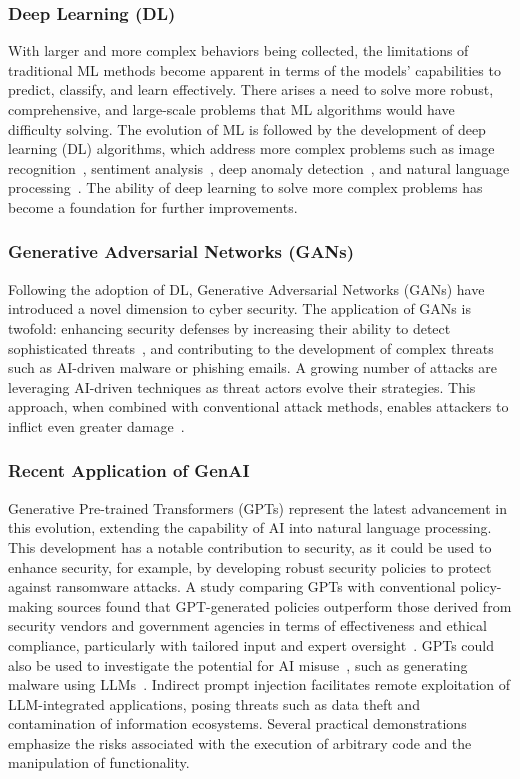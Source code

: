 \subsubsection{Deep Learning (DL)}
%
With larger and more complex behaviors being collected, the limitations of traditional ML methods become apparent in terms of the models' capabilities to predict, classify, and learn effectively.
There arises a need to solve more robust, comprehensive, and large-scale problems that ML algorithms would have difficulty solving.
The evolution of ML is followed by the development of deep learning (DL) algorithms, which address more complex problems such as image recognition~\citet{Alzubaidi2021-dk}, sentiment analysis~\citet{zhang2018deep}, deep anomaly detection~\citet{pang2021deep}, and natural language processing~\citet{ghosh2016contextual}.
The ability of deep learning to solve more complex problems has become a foundation for further improvements.
%
\subsubsection{Generative Adversarial Networks (GANs)}
%
Following the adoption of DL, Generative Adversarial Networks (GANs) have introduced a novel dimension to cyber security.
The application of GANs is twofold: enhancing security defenses by increasing their ability to detect sophisticated threats~\citet{park2022enhanced, yinka2020review}, and contributing to the development of complex threats such as AI-driven malware or phishing emails.
A growing number of attacks are leveraging AI-driven techniques as threat actors evolve their strategies. This approach, when combined with conventional attack methods, enables attackers to inflict even greater damage~\citet{kaloudi2020ai}.
%
\subsubsection{Recent Application of GenAI}
%
Generative Pre-trained Transformers (GPTs) represent the latest advancement in this evolution, extending the capability of AI into natural language processing.
This development has a notable contribution to security, as it could be used to enhance security, for example, by developing robust security policies to protect against ransomware attacks.
A study comparing GPTs with conventional policy-making sources found that GPT-generated policies outperform those derived from security vendors and government agencies in terms of effectiveness and ethical compliance, particularly with tailored input and expert oversight~\citet{mcintosh2023harnessing}.
GPTs could also be used to investigate the potential for AI misuse~\citet{renaud2023chatgpt}, such as generating malware using LLMs~\citet{pa2023attacker, greshake2023not}.
Indirect prompt injection facilitates remote exploitation of LLM-integrated applications, posing threats such as data theft and contamination of information ecosystems.
Several practical demonstrations emphasize the risks associated with the execution of arbitrary code and the manipulation of functionality.
%
